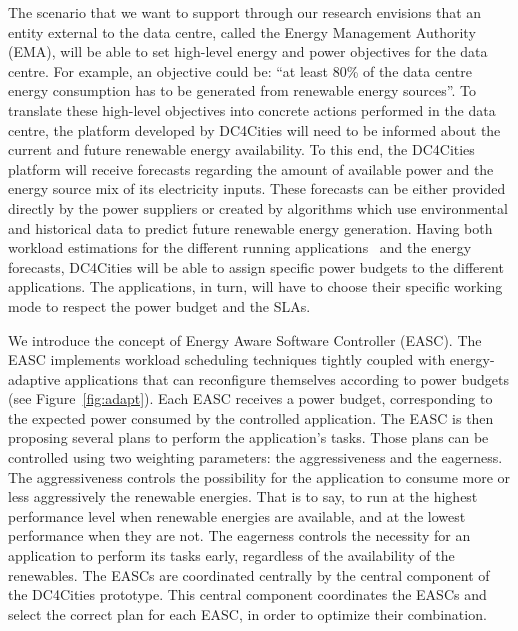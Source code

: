 \documentclass[conference]{IEEEtran}
\begin{document}
The scenario that we want to support through our research envisions that an entity external to the data centre, called the Energy Management Authority (EMA), will be able to set high-level energy and power objectives for the data centre.
For example, an objective could be: \enquote{at least 80\% of the data centre energy consumption has to be generated from renewable energy sources}.
To translate these high-level objectives into concrete actions performed in the data centre, the platform developed by DC4Cities will need to be informed about the current and future renewable energy availability.
To this end, the DC4Cities platform will receive forecasts regarding the amount of available power and the energy source mix of its electricity inputs.
These forecasts can be either provided directly by the power suppliers or created by algorithms which use environmental and historical data to predict future renewable energy generation.
Having both workload estimations for the different running applications~\cite{Kansal2008} and the energy forecasts, DC4Cities will be able to assign specific power budgets to the different applications.
The applications, in turn, will have to choose their specific working mode to respect the power budget and the SLAs.

We introduce the concept of Energy Aware Software Controller (EASC).
The EASC implements workload scheduling techniques tightly coupled with energy-adaptive applications that can reconfigure themselves according to power budgets (see Figure~\ref{fig:adapt}).
Each EASC receives a power budget, corresponding to the expected power consumed by the controlled application.
The EASC is then proposing several plans to perform the application's tasks.
Those plans can be controlled using two weighting parameters: the aggressiveness and the eagerness.
The aggressiveness controls the possibility for the application to consume more or less  aggressively the renewable energies.
That is to say, to run at the highest performance level when renewable energies are available, and at the lowest performance when they are not.
The eagerness controls the necessity for an application to perform its tasks early, regardless of the availability of the renewables.
The EASCs are coordinated centrally by the central component of the DC4Cities prototype.
This central component coordinates the EASCs and select the correct plan for each EASC, in order to optimize their combination.
\end{document}
